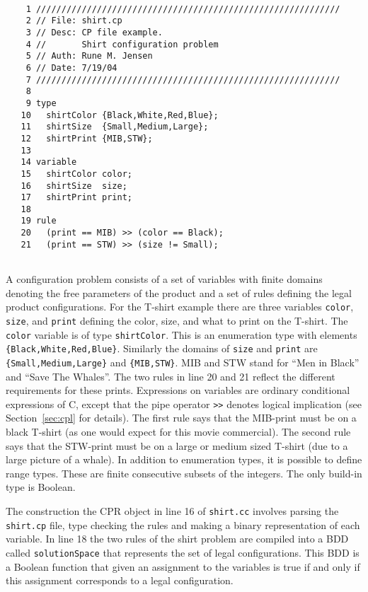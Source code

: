 \documentclass{article}
\begin{document}
\footnotesize
\begin{verbatim}
   
    1 ////////////////////////////////////////////////////////////
    2 // File: shirt.cp
    3 // Desc: CP file example. 
    4 //       Shirt configuration problem 
    5 // Auth: Rune M. Jensen
    6 // Date: 7/19/04
    7 ////////////////////////////////////////////////////////////
    8 
    9 type
   10   shirtColor {Black,White,Red,Blue};
   11   shirtSize  {Small,Medium,Large};   
   12   shirtPrint {MIB,STW};          
   13
   14 variable
   15   shirtColor color;
   16   shirtSize  size; 
   17   shirtPrint print;
   18 
   19 rule
   20   (print == MIB) >> (color == Black);	
   21   (print == STW) >> (size != Small); 
   
\end{verbatim}
\normalsize
A configuration problem consists of a set of variables with finite
domains denoting the free parameters of the product and a set
of rules defining the legal product configurations. For the T-shirt
example there are three variables \texttt{color}, \texttt{size}, and
\texttt{print} defining the color, size, and what to print on the 
T-shirt. The \texttt{color} variable is of type \texttt{shirtColor}.
This is an enumeration type with elements \texttt{\{Black,White,Red,Blue\}}.
Similarly the domains of \texttt{size} and \texttt{print} are
\texttt{\{Small,Medium,Large\}} and \texttt{\{MIB,STW\}}. MIB and STW stand 
for ``Men in Black'' and ``Save The Whales''. The two rules in line 20
and 21 reflect the different requirements for these
prints. Expressions on variables are ordinary conditional expressions
of C, except that the pipe operator \texttt{>>} denotes logical
implication (see Section~\ref{sec:cpl} for details). The first rule
says that the MIB-print must be on a black T-shirt (as one would
expect for this movie commercial). The second rule says that the
STW-print must be on a large or medium sized T-shirt (due to a large
picture of a whale). In addition to enumeration types, it is possible
to define range types.  These are finite consecutive subsets of the
integers. The only build-in type is Boolean.

The construction the CPR object in line 16 of \texttt{shirt.cc}
involves parsing the \texttt{shirt.cp} file, type checking the rules
and making a binary representation of each variable. In line 18 the
two rules of the shirt problem are compiled into a BDD called
\texttt{solutionSpace} that represents the set of legal
configurations. This BDD is a Boolean function that given an
assignment to the variables is true if and only if this assignment
corresponds to a legal configuration.
\end{document}
